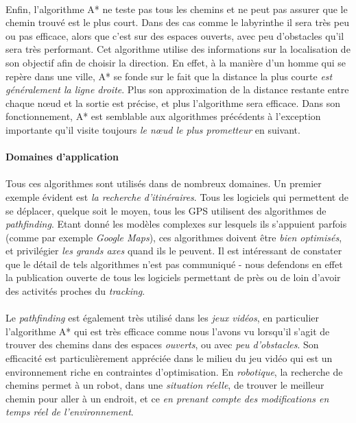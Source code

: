 \paragraph{} Enfin, l'algorithme A* ne teste pas tous les chemins et ne peut pas assurer que le chemin trouvé est le
plus court. Dans des cas comme le labyrinthe il sera très peu ou pas efficace, alors que c'est sur des espaces ouverts,
avec peu d'obstacles qu'il sera très performant. Cet algorithme utilise des informations sur la localisation de son
objectif afin de choisir la direction. En effet, à la manière d'un homme qui se repère dans une ville, A* se fonde sur le
fait que la distance la plus courte \emph{est généralement la ligne droite}. Plus son approximation de la distance 
restante entre chaque n\oe{}ud et la sortie est précise, et plus l'algorithme sera efficace. Dans son fonctionnement, A*
est semblable aux algorithmes précédents à l'exception importante qu'il visite toujours \emph{le n\oe{}ud le plus
prometteur} en suivant.

\paragraph{Domaines d'application}

\paragraph{} Tous ces algorithmes sont utilisés dans de nombreux domaines. Un premier exemple évident
est \emph{la recherche d'itinéraires}. Tous les logiciels qui permettent de se déplacer, quelque soit le moyen,
tous les GPS utilisent des algorithmes de \emph{pathfinding}. Etant donné les modèles complexes sur lesquels
ils s'appuient parfois (comme par exemple \emph{Google Maps}), ces algorithmes doivent être \emph{bien optimisés},
et privilégier \emph{les grands axes} quand ils le peuvent. Il est intéressant de constater que le détail de tels
algorithmes n'est pas communiqué - nous defendons en effet la publication ouverte de tous les logiciels permettant de près
ou de loin d'avoir des activités proches du \emph{tracking}.

\paragraph{} Le \emph{pathfinding} est également très utilisé dans les \emph{jeux vidéos}, en particulier l'algorithme A*
qui est très efficace comme nous l'avons vu lorsqu'il s'agit de trouver des chemins dans des espaces \emph{ouverts}, ou
avec \emph{peu d'obstacles}. Son efficacité est particulièrement appréciée dans le milieu du jeu vidéo qui est 
un environnement riche en contraintes d'optimisation. En \emph{robotique}, la recherche de chemins permet à un robot,
dans une \emph{situation réelle}, de trouver le meilleur chemin pour aller à un endroit, et ce \emph{en prenant compte des
modifications en temps réel de l'environnement}.

